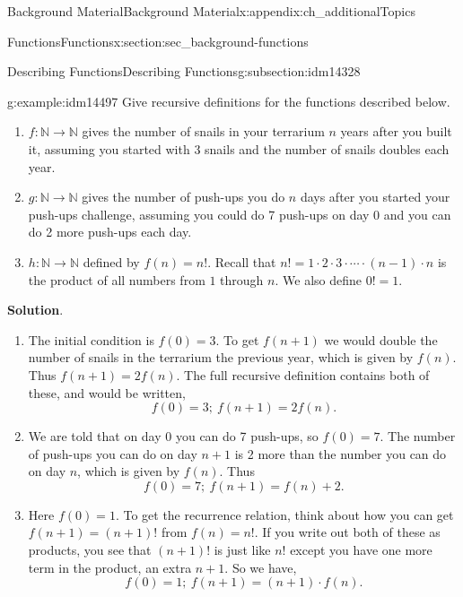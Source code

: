 \documentclass[oneside,10pt,]{book}
\numberwithin{equation}{chapter}
\def\N{\mathbb N}
\begin{document}
\begin{appendixptx}{Background Material}{}{Background Material}{}{}{x:appendix:ch_additionalTopics}
\begin{sectionptx}{Functions}{}{Functions}{}{}{x:section:sec_background-functions}
\begin{subsectionptx}{Describing Functions}{}{Describing Functions}{}{}{g:subsection:idm14328}
\begin{example}{}{g:example:idm14497}
Give recursive definitions for the functions described below.%
\begin{enumerate}
\item{}\(f:\N \to \N\) gives the number of snails in your terrarium \(n\) years after you built it, assuming you started with 3 snails and the number of snails doubles each year.%
\item{}\(g:\N \to \N\) gives the number of push-ups you do \(n\) days after you started your push-ups challenge, assuming you could do 7 push-ups on day 0 and you can do 2 more push-ups each day.%
\item{}\(h:\N \to \N\) defined by \(f(n) = n!\).  Recall that \(n! = 1 \cdot 2 \cdot 3 \cdot \cdots \cdot (n-1)\cdot n\) is the product of all numbers from \(1\) through \(n\).  We also define \(0! = 1\).%
\end{enumerate}
%
\par\smallskip%
\noindent\textbf{Solution}.\hypertarget{g:solution:idm14517}{}\quad{}%
\begin{enumerate}
\item{}The initial condition is \(f(0) = 3\).  To get \(f(n+1)\) we would double the number of snails in the terrarium the previous year, which is given by \(f(n)\).  Thus \(f(n+1) = 2f(n)\).  The full recursive definition contains both of these, and would be written,%
\begin{equation*}
f(0) = 3;~ f(n+1) = 2f(n).
\end{equation*}
%
\item{}We are told that on day 0 you can do 7 push-ups, so \(f(0) = 7\).  The number of push-ups you can do on day \(n+1\) is 2 more than the number you can do on day \(n\), which is given by \(f(n)\).  Thus%
\begin{equation*}
f(0) = 7;~ f(n+1) = f(n) + 2.
\end{equation*}
%
\item{}Here \(f(0) = 1\).  To get the recurrence relation, think about how you can get \(f(n+1) = (n+1)!\) from \(f(n) = n!\).  If you write out both of these as products, you see that \((n+1)!\) is just like \(n!\) except you have one more term in the product, an extra \(n+1\).  So we have,%
\begin{equation*}
f(0) = 1;~ f(n+1) = (n+1)\cdot f(n).
\end{equation*}
%
\end{enumerate}
%
\end{example}
\end{subsectionptx}
%
%
\typeout{************************************************}

\end{sectionptx}
\end{appendixptx}
\end{document}
